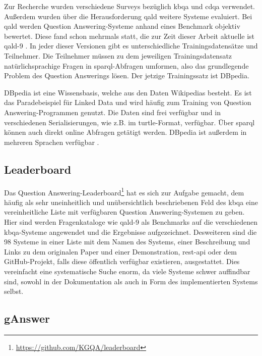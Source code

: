 Zur Recherche wurden verschiedene Surveys bezüglich \ac{kbqa} und \ac{cdqa} verwendet.
Außerdem wurden über die Herausforderung \ac{qald} weitere Systeme evaluiert.
Bei \ac{qald} werden Question Answering-Systeme anhand eines Benchmark objektiv bewertet.
Diese fand schon mehrmals statt, die zur Zeit dieser Arbeit aktuelle ist \ac{qald}-9 \citep{qald9}.
In jeder dieser Versionen gibt es unterschiedliche Trainingsdatensätze und Teilnehmer.
Die Teilnehmer müssen zu dem jeweiligen Trainingsdatensatz natürlichsprachige Fragen in \ac{sparql}-Abfragen umformen, also das grundlegende Problem des Question Answerings lösen.
Der jetzige Trainingssatz ist DBpedia.

DBpedia ist eine Wissensbasis, welche aus den Daten Wikipedias besteht.
Es ist das Paradebeispiel für Linked Data und wird häufig zum Training von Question Answering-Programmen genutzt.
Die Daten sind frei verfügbar und in verschiedenen Serialisierungen, wie z.B. im \ac{turtle}-Format, verfügbar.
Über \ac{sparql} können auch direkt online Abfragen getätigt werden.
DBpedia ist außerdem in mehreren Sprachen verfügbar \citep{dbpedia}.

\subsection{Leaderboard}

Das Question Answering-Leaderboard\footnote{\url{https://github.com/KGQA/leaderboard}} \citep{kgqaleaderboard} hat es sich zur Aufgabe gemacht,
dem häufig als sehr uneinheitlich und unübersichtlich \citep{diefenbachkbqa} beschriebenen Feld des \ac{kbqa} eine vereinheitliche Liste mit verfügbaren Question Answering-Systemen zu geben.
Hier sind werden Fragenkataloge wie \ac{qald}-9 als Benchmarks auf die verschiedenen \ac{kbqa}-Systeme angewendet und die Ergebnisse aufgezeichnet.
Desweiteren sind die 98 Systeme in einer Liste mit dem Namen des Systems, einer Beschreibung und Links zu dem originalen Paper und einer Demonstration,
\ac{rest}-\ac{api} oder dem GitHub-Projekt, falls diese öffentlich verfügbar existieren, ausgestattet.
Dies vereinfacht eine systematische Suche enorm, da viele Systeme schwer auffindbar sind, sowohl in der Dokumentation als auch in Form des implementierten Systems selbst.

\subsection{gAnswer}

